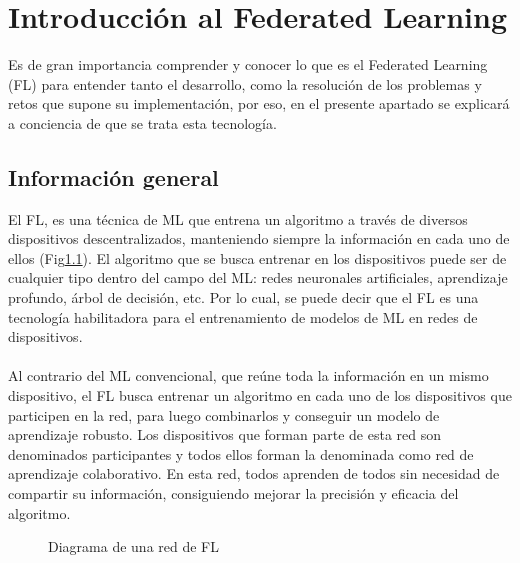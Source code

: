 \chapter{Introducción al Federated Learning}
\thispagestyle{fancy}
Es de gran importancia comprender y conocer lo que es el Federated Learning (FL) para entender tanto el desarrollo, como la resolución de los problemas y retos que supone su implementación, por eso, en el presente apartado se explicará a conciencia de que se trata esta tecnología. 

\section{Información general}
El FL, es una técnica de ML que entrena un algoritmo a través de diversos dispositivos descentralizados, manteniendo siempre la información en cada uno de ellos (Fig\ref{fig:FedLearArquitectura}). El algoritmo que se busca entrenar en los dispositivos puede ser de cualquier tipo dentro del campo del ML: redes neuronales artificiales, aprendizaje profundo, árbol de decisión, etc. Por lo cual, se puede decir que el FL es una tecnología habilitadora para el entrenamiento de modelos de ML en redes de dispositivos.
\\ \\
Al contrario del ML convencional, que reúne toda la información en un mismo dispositivo, el FL busca entrenar un algoritmo en cada uno de los dispositivos que participen en la red, para luego combinarlos y conseguir un modelo de aprendizaje robusto. Los dispositivos que forman parte de esta red son denominados participantes y todos ellos forman la denominada como red de aprendizaje colaborativo. En esta red, todos aprenden de todos sin necesidad de compartir su información, consiguiendo mejorar la precisión y eficacia del algoritmo. 
\begin{figure}[H]
    \centering
    \caption{Diagrama de una red de FL} 
    \label{fig:FedLearArquitectura}
\end{figure}
